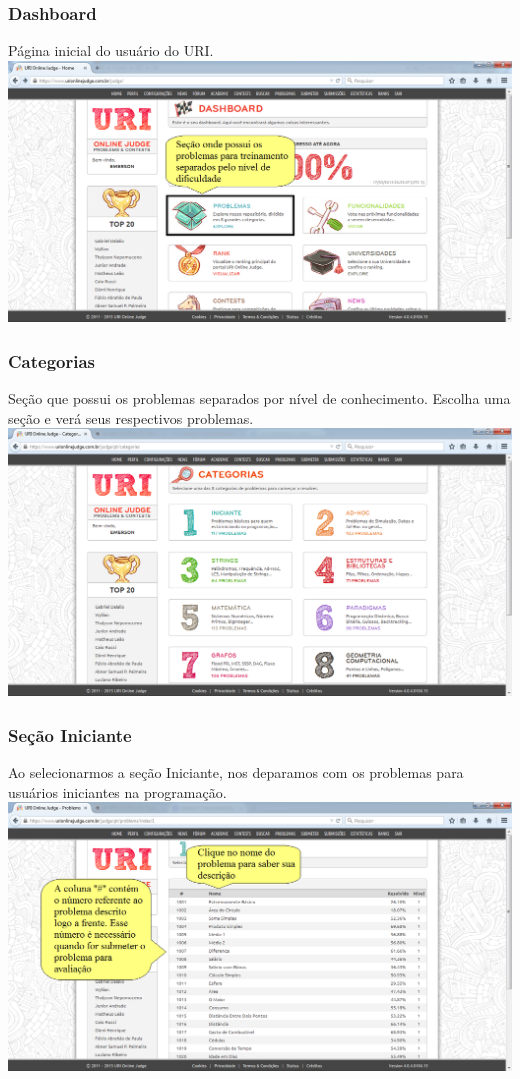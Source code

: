 \begin{frame}
 \frametitle{Dashboard}
 Página inicial do usuário do URI.
 \includegraphics[scale=.28]{uri/Imagens/04Dashboard.png}
\end{frame}

\begin{frame}
 \frametitle{Categorias}
 Seção que possui os problemas separados por nível de conhecimento.
 Escolha uma seção e verá seus respectivos problemas.
 \includegraphics[scale=.28]{uri/Imagens/05Categorias.png}
\end{frame}

\begin{frame}
 \frametitle{Seção Iniciante}
 Ao selecionarmos a seção Iniciante, nos deparamos com os
 problemas para usuários iniciantes na programação.
 \includegraphics[scale=.28]{uri/Imagens/06Iniciante.png}
\end{frame}

